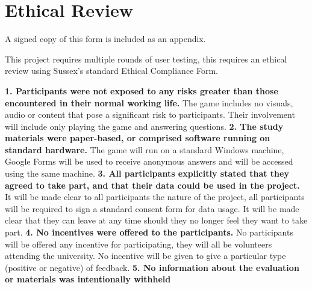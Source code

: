 \documentclass{report}
\begin{document}
\section{Ethical Review}

A signed copy of this form is included as an appendix.

This project requires multiple rounds of user testing, this requires an ethical review using Sussex's standard Ethical Compliance Form.
\begin{raggedright}
\newline
\newline
\textbf{1. Participants were not exposed to any risks greater than those
encountered in their normal working life.}
\newline
\newline
The game includes no visuals, audio or content that pose a significant risk to participants. Their involvement will include only playing the game and answering questions.
\newline
\newline
\textbf{2. The study materials were paper-based, or comprised software
running on standard hardware.}
\newline
\newline
The game will run on a standard Windows machine, Google Forms will be used to receive anonymous answers and will be accessed using the same machine.
\newline
\newline
\textbf{3. All participants explicitly stated that they agreed to take part,
and that their data could be used in the project.}
\newline
\newline
It will be made clear to all participants the nature of the project, all participants will be required to sign a standard consent form for data usage. It will be made clear that they can leave at any time should they no longer feel they want to take part.
\newline
\newline
\textbf{4. No incentives were offered to the participants.}
\newline
\newline
No participants will be offered any incentive for participating, they will all be volunteers attending the university. No incentive will be given to give a particular type (positive or negative) of feedback.
\newline
\newline
\textbf{5. No information about the evaluation or materials was intentionally withheld
}
\end{raggedright}
\end{document}
